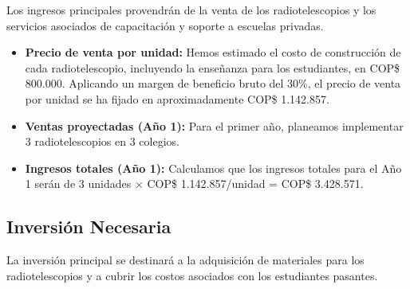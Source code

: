 Los ingresos principales provendrán de la venta de los radiotelescopios y los 
servicios asociados de capacitación y soporte a escuelas privadas.

\begin{itemize}
    \item \textbf{Precio de venta por unidad:} Hemos estimado el costo de 
			construcción de cada radiotelescopio, incluyendo la enseñanza para los 
			estudiantes, en COP\$ 800.000. Aplicando un margen de beneficio bruto del 
			30\%, el precio de venta por unidad se ha fijado en aproximadamente 
			COP\$ 1.142.857.
    \item \textbf{Ventas proyectadas (Año 1):} Para el primer año, planeamos 
			implementar 3 radiotelescopios en 3 colegios.
    \item \textbf{Ingresos totales (Año 1):} Calculamos que los ingresos 
			totales para el Año 1 serán de 3 unidades 
			$\times$ COP\$ 1.142.857/unidad = COP\$ 3.428.571.
\end{itemize}

\subsection*{Inversión Necesaria}

La inversión principal se destinará a la adquisición de materiales para los 
radiotelescopios y a cubrir los costos asociados con los estudiantes pasantes.


